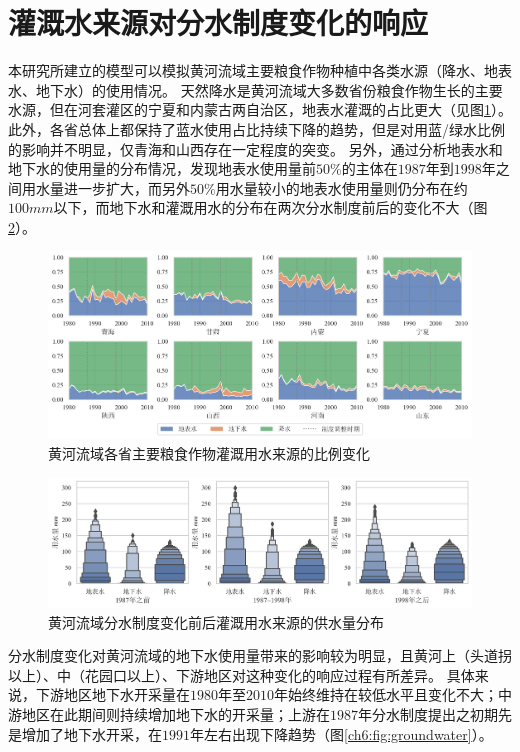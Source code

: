 \section{灌溉水来源对分水制度变化的响应}

本研究所建立的模型可以模拟黄河流域主要粮食作物种植中各类水源（降水、地表水、地下水）的使用情况。
天然降水是黄河流域大多数省份粮食作物生长的主要水源，但在河套灌区的宁夏和内蒙古两自治区，地表水灌溉的占比更大（见图\ref{ch6:fig:sources}）。
此外，各省总体上都保持了蓝水使用占比持续下降的趋势，但是对用蓝/绿水比例的影响并不明显，仅青海和山西存在一定程度的突变。
另外，通过分析地表水和地下水的使用量的分布情况，发现地表水使用量前$50\%$的主体在$1987$年到$1998$年之间用水量进一步扩大，而另外$50\%$用水量较小的地表水使用量则仍分布在约$100mm$以下，而地下水和灌溉用水的分布在两次分水制度前后的变化不大（图\ref{ch6:fig:sources_change}）。


\begin{figure}[htb]
    \centering
    \includegraphics[width=\textwidth]{img/ch6/ch6_green_blue_water.png}
    \caption{黄河流域各省主要粮食作物灌溉用水来源的比例变化}\label{ch6:fig:sources}
\end{figure}

\begin{figure}[htb]
    \centering
    \includegraphics[width=\textwidth]{img/ch6/ch6_sources_change.png}
    \caption{黄河流域分水制度变化前后灌溉用水来源的供水量分布}\label{ch6:fig:sources_change}
\end{figure}

分水制度变化对黄河流域的地下水使用量带来的影响较为明显，且黄河上（头道拐以上）、中（花园口以上）、下游地区对这种变化的响应过程有所差异。
具体来说，下游地区地下水开采量在$1980$年至$2010$年始终维持在较低水平且变化不大；中游地区在此期间则持续增加地下水的开采量；上游在$1987$年分水制度提出之初期先是增加了地下水开采，在$1991$年左右出现下降趋势（图\ref{ch6:fig:groundwater}）。

